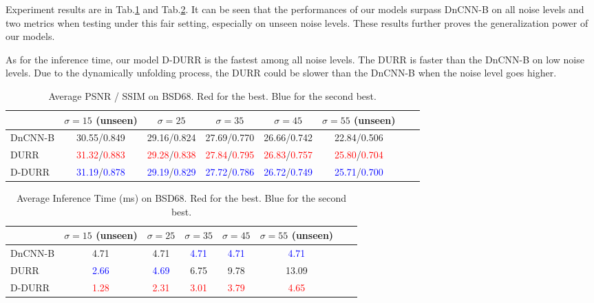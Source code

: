 \documentclass{article} %
\newcommand{\red}[1]{\textcolor{red}{#1}}
\newcommand{\blue}[1]{\textcolor{blue}{#1}}
\begin{document}
Experiment results are in Tab.\ref{exptable} and Tab.\ref{exptable1}.
It can be seen that the performances of our models
surpass DnCNN-B on all noise levels and two metrics
when testing under this fair setting, especially on unseen noise levels.
These results further proves the generalization power of our models.

As for the inference time, our model D-DURR is the fastest among all
noise levels. The DURR is faster than the DnCNN-B on low noise levels.
Due to the dynamically unfolding process, the DURR could be slower
than the DnCNN-B when the noise level goes higher.

\begin{table}[htp!]
	\caption{Average PSNR / SSIM on BSD68.
	Red for the best. Blue for the second best.}
	\vspace{-0.08in}
	\label{exptable}
	\centering
	\begin{tabular}{lccccccc}
		\toprule
		 &$\sigma=15$ (unseen)
		 &$\sigma=25$
		 &$\sigma=35$
		 &$\sigma=45$
		 &$\sigma=55$ (unseen)\\
		\midrule
		\midrule
		DnCNN-B
		&30.55/0.849
		&29.16/0.824
		&27.69/0.770
		&26.66/0.742
		&22.84/0.506 \\
		DURR
		&\red{31.32}/\red{0.883}
		&\red{29.28}/\red{0.838}
		&\red{27.84}/\red{0.795}
		&\red{26.83}/\red{0.757}
		&\red{25.80}/\red{0.704} \\
		D-DURR
		&\blue{31.19}/\blue{0.878}
		&\blue{29.19}/\blue{0.829}
		&\blue{27.72}/\blue{0.786}
		&\blue{26.72}/\blue{0.749}
		&\blue{25.71}/\blue{0.700} \\
		\bottomrule
	\end{tabular}
\end{table}

\begin{table}[htp!]
	\caption{Average Inference Time (ms) on BSD68.
	Red for the best. Blue for the second best.}
	\vspace{-0.08in}
	\label{exptable1}
	\centering
	\begin{tabular}{lccccccc}
		\toprule
		 &$\sigma=15$ (unseen)
		 &$\sigma=25$
		 &$\sigma=35$
		 &$\sigma=45$
		 &$\sigma=55$ (unseen)\\
		\midrule
		\midrule
		DnCNN-B
		&4.71
		&4.71
		&\blue{4.71}
		&\blue{4.71}
		&\blue{4.71} \\
		DURR
		&\blue{2.66}
		&\blue{4.69}
		&6.75
		&9.78
		&13.09 \\
		D-DURR
		&\red{1.28}
		&\red{2.31}
		&\red{3.01}
		&\red{3.79}
		&\red{4.65} \\
		\bottomrule
	\end{tabular}
\end{table}
\end{document}
